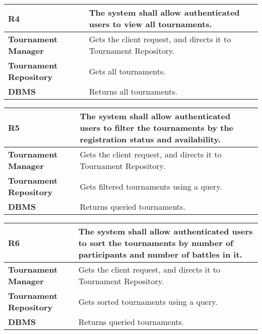\begin{table}[h!]
  \centering
  \begin{tabular}{lp{12cm}}
    \hline
    \textbf{R4} & The system shall allow authenticated users to view all tournaments. \\
    \hline
    \hline
    \textbf{Tournament Manager} & Gets the client request, and directs it to Tournament Repository. \\
    \textbf{Tournament Repository} &  Gets all tournaments.\\
    \textbf{DBMS} & Returns all tournaments. \\
    \hline
  \end{tabular}
\end{table}

\begin{table}[h!]
  \centering
  \begin{tabular}{lp{12cm}}
    \hline
    \textbf{R5} & The system shall allow authenticated users to filter the tournaments by the registration status and availability.  \\
    \hline
    \hline
    \textbf{Tournament Manager} & Gets the client request, and directs it to Tournament Repository. \\
    \textbf{Tournament Repository} &  Gets filtered tournaments using a query.\\
    \textbf{DBMS} & Returns queried tournaments. \\
    \hline
  \end{tabular}
\end{table}

\begin{table}[h!]
  \centering
  \begin{tabular}{lp{12cm}}
    \hline
    \textbf{R6} & The system shall allow authenticated users to sort the tournaments by number of participants and number of battles in it. \\
    \hline
    \hline
    \textbf{Tournament Manager} & Gets the client request, and directs it to Tournament Repository. \\
    \textbf{Tournament Repository} &  Gets sorted tournaments using a query.\\
    \textbf{DBMS} & Returns queried tournaments. \\
    \hline
  \end{tabular}
\end{table}

